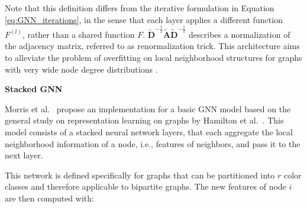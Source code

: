 Note that this definition differs from the iterative formulation in Equation \ref{eq:GNN_iterations}, in the sense that each layer applies a different function $F^{(l)}$, rather than a shared function $F$. $\tilde{\mathbf{D}}^{-\frac{1}{2}}\tilde{\mathbf{A}}\tilde{\mathbf{D}}^{-\frac{1}{2}}$ describes a normalization of the adjacency matrix, referred to as renormalization trick. This architecture aims to alleviate the problem of overfitting on local neighborhood structures for graphs with very wide node degree distributions \cite{kipf2016semi}. \bigskip


\textbf{Stacked GNN} \par
Morris et al.~\cite{morris2019weisfeiler} propose an implementation for a basic GNN model based on the general study on representation learning on graphs by Hamilton et al.~\cite{hamilton2017representation}. This model consists of a stacked neural network layers, that each aggregate the local neighborhood information of a node, i.e., features of neighbors, and pass it to the next layer.

This network is defined specifically for graphs that can be partitioned into $r$ color classes and therefore applicable to bipartite graphs. The new features of node $i$ are then computed with:

